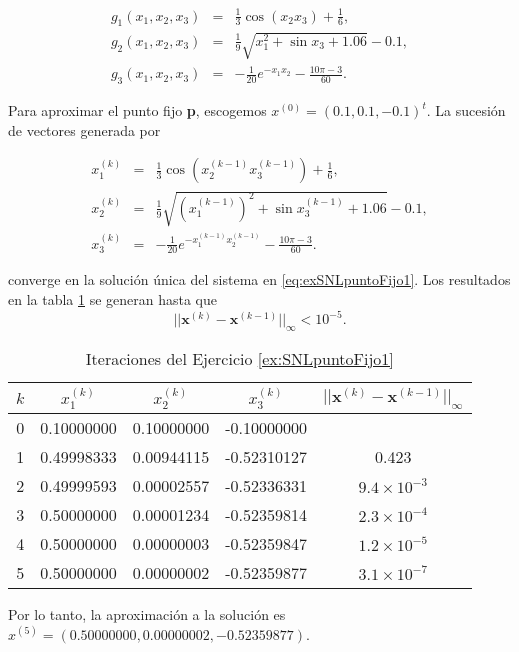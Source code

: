 \begin{exerciseT}
\begin{equation*}
  \begin{array}{ccl}
    g_1(x_1,x_2,x_3) & = & \frac{1}{3}\cos (x_2x_3) + \frac{1}{6},\\
    g_2(x_1,x_2,x_3) & = & \frac{1}{9}\sqrt{x_1^2 + \sin x_3 + 1.06} - 0.1,\\ 
    g_3(x_1,x_2,x_3) & = & -\frac{1}{20}e^{-x_1x_2}-\frac{10\pi-3}{60}.    
  \end{array}
\end{equation*}

Para aproximar el punto fijo \textbf{p}, escogemos $x^{(0)} = (0.1, 0.1, -0.1)^t$. La sucesión de vectores generada por

\begin{equation*}
  \begin{array}{ccl}
    x_1^{(k)} & = & \frac{1}{3}\cos \left(x_2^{(k-1)}x_3^{(k-1)}\right) + \frac{1}{6},\\
    x_2^{(k)} & = & \frac{1}{9}\sqrt{\left(x_1^{(k-1)}\right)^2 + \sin x_3^{(k-1)} + 1.06} - 0.1,\\ 
    x_3^{(k)} & = & -\frac{1}{20}e^{-x_1^{(k-1)}x_2^{(k-1)}}-\frac{10\pi-3}{60}.    
  \end{array}
\end{equation*}

converge en la solución única del sistema en \ref{eq:exSNLpuntoFijo1}. Los resultados en la tabla \ref{table:exSNLpuntoFijo1} se generan hasta que
$$||\textbf{x}^{(k)} - \textbf{x}^{(k-1)}||_\infty < 10^{-5}.$$

\begin{table}[H]
	\centering
	\begin{tabular}{ccccc}
		\toprule
		$k$ & $x_1^{(k)}$ & $x_2^{(k)}$ & $x_3^{(k)}$ & $||\textbf{x}^{(k)} - \textbf{x}^{(k-1)}||_\infty$ \\\midrule
		0 & 0.10000000 & 0.10000000 & -0.10000000 & \\
		1 & 0.49998333 & 0.00944115 & -0.52310127 & 0.423 \\
		2 & 0.49999593 & 0.00002557 & -0.52336331 & $9.4\times 10^{-3}$\\
		3 & 0.50000000 & 0.00001234 & -0.52359814 & $2.3\times 10^{-4}$\\
		4 & 0.50000000 & 0.00000003 & -0.52359847 & $1.2\times 10^{-5}$\\
		5 & 0.50000000 & 0.00000002 & -0.52359877 & $3.1\times 10^{-7}$\\
		\bottomrule
	\end{tabular}
	\caption{Iteraciones del Ejercicio \ref{ex:SNLpuntoFijo1}}
    \label{table:exSNLpuntoFijo1}
\end{table} 

Por lo tanto, la aproximación a la solución es $x^{(5)} = (0.50000000, 0.00000002, -0.52359877)$.  
 \label{ex:SNLpuntoFijo1}
\end{exerciseT}


